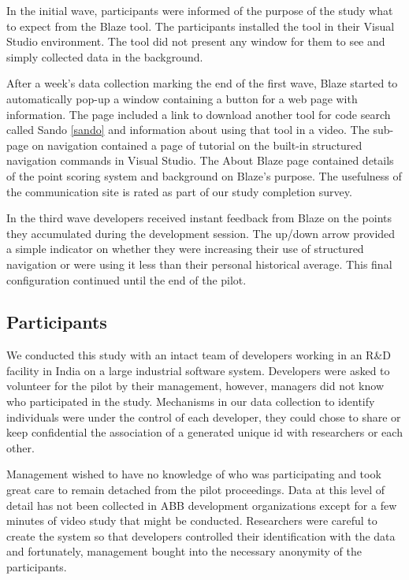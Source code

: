 \documentclass{sig-alternate}
\begin{document}
In the initial wave, participants were informed of the purpose of the study what to expect from the Blaze tool.  The participants installed the tool in their Visual Studio environment.  The tool did not present any window for them to see and simply collected data in the background.   

After a week's data collection marking the end of the first wave, Blaze started to automatically pop-up a window containing a button for a web page with information.  The page included a link to download another tool for code search called Sando \ref{sando} and information about using that tool in a video.  The sub-page on navigation contained a page of tutorial on the built-in structured navigation commands in Visual Studio.  The About Blaze page contained details of the point scoring system and background on Blaze's purpose.  The usefulness of the communication site is rated as part of our study completion survey.

In the third wave developers received instant feedback from Blaze on the points they accumulated during the development session.  The up/down arrow provided a simple indicator on whether they were increasing their use of structured navigation or were using it less than their personal historical average.  This final configuration continued until the end of the pilot.  

\subsection{Participants}

We conducted this study with an intact team of developers working in an R\&D facility in India on a large industrial software system.  Developers were asked to volunteer for the pilot by their management, however, managers did not know who participated in the study.  Mechanisms in our data collection to identify individuals were under the control of each developer, they could chose to share or keep confidential the association of a generated unique id with researchers or each other.  

Management wished to have no knowledge of who was participating and took great care to remain detached from the pilot proceedings.  Data at this level of detail has not been collected in ABB development organizations except for a few minutes of video study that might be conducted.  Researchers were careful to create the system so that developers controlled their identification with the data and fortunately, management bought into the necessary anonymity of the participants.
\end{document}
